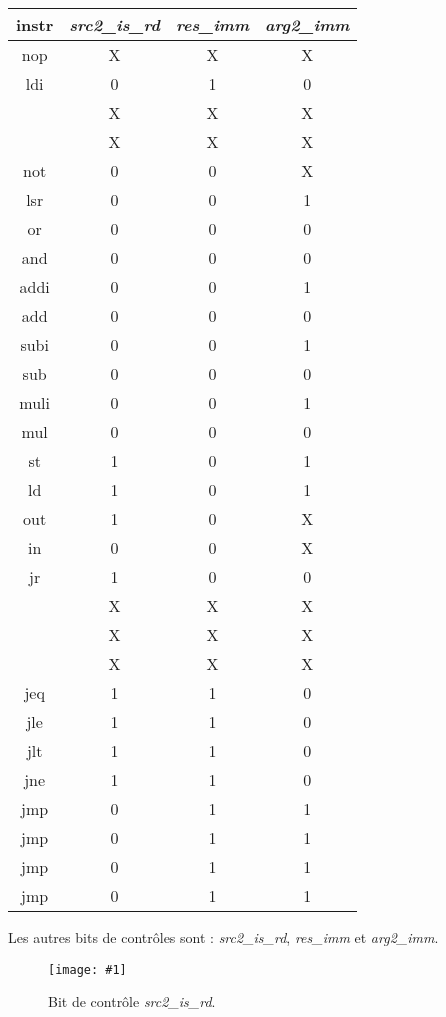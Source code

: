 \documentclass[twoside, 12pt, a4paper]{article}
\newcommand{\cf}[3]{
    \begin{figure}[!h]
        \centering
        \texttt{[image: \#1]}
    \caption{#3}\label{Fig:#1}
    \end{figure}
}
\newcommand{\hcf}[2]{\cf{#1}{.75}{#2}}
\begin{document}
    \begin{center}
    	\begin{tabular}{|c|c|c|c|}
		\hline
		instr & \textit{src2\_is\_rd} & \textit{res\_imm} & \textit{arg2\_imm}\\
            \hline
		nop		& X & X & X\\
		ldi		& 0 & 1 & 0\\
				  & X & X & X\\
				  & X & X & X\\
		\hline
		not		& 0 & 0 & X\\
		lsr		& 0 & 0 & 1\\
		or		& 0 & 0 & 0\\
		and		& 0 & 0 & 0\\
		\hline
		addi	& 0 & 0 & 1\\
		add		& 0 & 0 & 0\\
		subi	& 0 & 0 & 1\\
		sub		& 0 & 0 & 0\\
		\hline
		muli	& 0 & 0 & 1\\
		mul		& 0 & 0 & 0\\
		\hline
		st		& 1 & 0 & 1\\
		ld		& 1 & 0 & 1\\
		out		& 1 & 0 & X\\
		in		& 0 & 0 & X\\
		\hline 
		jr		& 1 & 0 & 0\\
				  & X & X & X\\
				  & X & X & X\\
				  & X & X & X\\
		\hline
		jeq		& 1 & 1 & 0\\
		jle		& 1 & 1 & 0\\
		jlt		& 1 & 1 & 0\\
		jne		& 1 & 1 & 0\\
		\hline
		jmp		& 0 & 1 & 1\\
		jmp		& 0 & 1 & 1\\
		jmp		& 0 & 1 & 1\\
		jmp		& 0 & 1 & 1\\
		\hline
	\end{tabular}
\end{center}

Les autres bits de contrôles sont : \textit{src2\_is\_rd}, \textit{res\_imm} et \textit{arg2\_imm}.

\hcf{src2_is_rd.png}{Bit de contrôle \textit{src2\_is\_rd}.}
\end{document}
